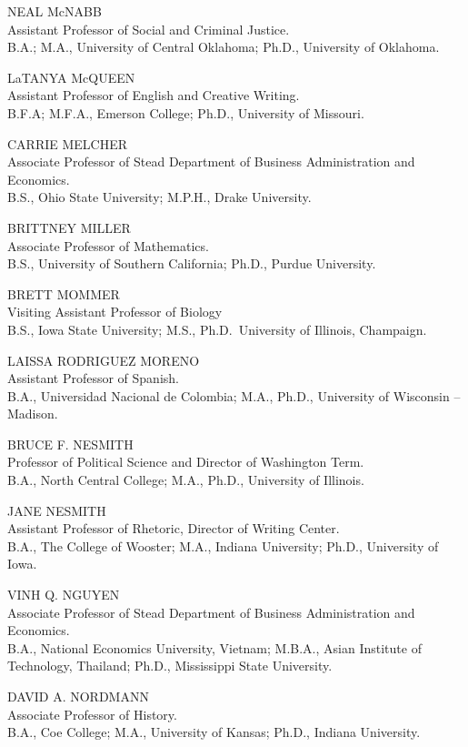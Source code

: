\documentclass[
  letterpaper,
]{scrbook}
\begin{document}
NEAL McNABB\\
Assistant Professor of Social and Criminal Justice.\\
B.A.; M.A., University of Central Oklahoma; Ph.D., University of
Oklahoma.

LaTANYA McQUEEN\\
Assistant Professor of English and Creative Writing.\\
B.F.A; M.F.A., Emerson College; Ph.D., University of Missouri.

CARRIE MELCHER\\
Associate Professor of Stead Department of Business Administration and
Economics.\\
B.S., Ohio State University; M.P.H., Drake University.

BRITTNEY MILLER\\
Associate Professor of Mathematics.\\
B.S., University of Southern California; Ph.D., Purdue University.

BRETT MOMMER\\
Visiting Assistant Professor of Biology\\
B.S., Iowa State University; M.S., Ph.D.~University of Illinois,
Champaign.

LAISSA RODRIGUEZ MORENO\\
Assistant Professor of Spanish.\\
B.A., Universidad Nacional de Colombia; M.A., Ph.D., University of
Wisconsin -- Madison.

BRUCE F. NESMITH\\
Professor of Political Science and Director of Washington Term.\\
B.A., North Central College; M.A., Ph.D., University of Illinois.

JANE NESMITH\\
Assistant Professor of Rhetoric, Director of Writing Center.\\
B.A., The College of Wooster; M.A., Indiana University; Ph.D.,
University of Iowa.

VINH Q. NGUYEN\\
Associate Professor of Stead Department of Business Administration and
Economics.\\
B.A., National Economics University, Vietnam; M.B.A., Asian Institute of
Technology, Thailand; Ph.D., Mississippi State University.

DAVID A. NORDMANN\\
Associate Professor of History.\\
B.A., Coe College; M.A., University of Kansas; Ph.D., Indiana
University.
\end{document}
